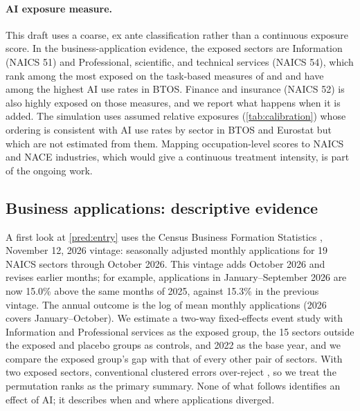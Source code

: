 \paragraph{AI exposure measure.}
This draft uses a coarse, ex ante classification rather than a continuous exposure score.
In the business-application evidence, the exposed sectors are Information (NAICS 51) and Professional, scientific, and technical services (NAICS 54), which rank among the most exposed on the task-based measures of \citet{eloundou2024gpts} and \citet{felten2021occupational} and have among the highest AI use rates in BTOS.
Finance and insurance (NAICS 52) is also highly exposed on those measures, and we report what happens when it is added.
The simulation uses assumed relative exposures (\cref{tab:calibration}) whose ordering is consistent with AI use rates by sector in BTOS and Eurostat but which are not estimated from them.
Mapping occupation-level scores to NAICS and NACE industries, which would give a continuous treatment intensity, is part of the ongoing work.

\subsection{Business applications: descriptive evidence}\label{sec:sig-bfs}

A first look at \cref{pred:entry} uses the Census Business Formation Statistics \citep{bfs2026}, November 12, 2026 vintage: seasonally adjusted monthly applications for 19 NAICS sectors through October 2026.
This vintage adds October 2026 and revises earlier months; for example, applications in January--September 2026 are now 15.0\% above the same months of 2025, against 15.3\% in the previous vintage.
The annual outcome is the log of mean monthly applications (2026 covers January--October).
We estimate a two-way fixed-effects event study with Information and Professional services as the exposed group, the 15 sectors outside the exposed and placebo groups as controls, and 2022 as the base year, and we compare the exposed group's gap with that of every other pair of sectors.
With two exposed sectors, conventional clustered errors over-reject \citep{conley2011inference}, so we treat the permutation ranks as the primary summary.
None of what follows identifies an effect of AI; it describes when and where applications diverged.

